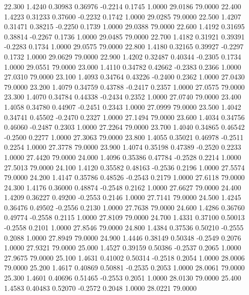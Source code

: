   22.300   1.4240   0.30983   0.36976  -0.2214   0.1745   1.0000  29.0186  79.0000
  22.400   1.4223   0.31233   0.37600  -0.2232   0.1742   1.0000  29.0285  79.0000
  22.500   1.4207   0.31471   0.38215  -0.2250   0.1739   1.0000  29.0388  79.0000
  22.600   1.4192   0.31695   0.38814  -0.2267   0.1736   1.0000  29.0485  79.0000
  22.700   1.4182   0.31921   0.39391  -0.2283   0.1734   1.0000  29.0575  79.0000
  22.800   1.4180   0.32165   0.39927  -0.2297   0.1732   1.0000  29.0629  79.0000
  22.900   1.4202   0.32487   0.40344  -0.2305   0.1734   1.0000  29.0551  79.0000
  23.000   1.4110   0.34782   0.42662  -0.2383   0.2366   1.0000  27.0310  79.0000
  23.100   1.4093   0.34764   0.43226  -0.2400   0.2362   1.0000  27.0430  79.0000
  23.200   1.4079   0.34759   0.43788  -0.2417   0.2357   1.0000  27.0575  79.0000
  23.300   1.4070   0.34784   0.44338  -0.2434   0.2352   1.0000  27.0740  79.0000
  23.400   1.4058   0.34780   0.44907  -0.2451   0.2343   1.0000  27.0999  79.0000
  23.500   1.4042   0.34741   0.45502  -0.2470   0.2327   1.0000  27.1494  79.0000
  23.600   1.4034   0.34756   0.46060  -0.2487   0.2303   1.0000  27.2264  79.0000
  23.700   1.4040   0.34865   0.46542  -0.2500   0.2277   1.0000  27.3063  79.0000
  23.800   1.4055   0.35021   0.46978  -0.2511   0.2254   1.0000  27.3778  79.0000
  23.900   1.4074   0.35198   0.47389  -0.2520   0.2233   1.0000  27.4420  79.0000
  24.000   1.4096   0.35386   0.47784  -0.2528   0.2214   1.0000  27.5013  79.0000
  24.100   1.4120   0.35582   0.48163  -0.2536   0.2196   1.0000  27.5574  79.0000
  24.200   1.4147   0.35786   0.48526  -0.2543   0.2179   1.0000  27.6118  79.0000
  24.300   1.4176   0.36000   0.48874  -0.2548   0.2162   1.0000  27.6627  79.0000
  24.400   1.4209   0.36227   0.49200  -0.2553   0.2146   1.0000  27.7141  79.0000
  24.500   1.4245   0.36476   0.49502  -0.2556   0.2130   1.0000  27.7638  79.0000
  24.600   1.4286   0.36760   0.49774  -0.2558   0.2115   1.0000  27.8109  79.0000
  24.700   1.4331   0.37100   0.50013  -0.2558   0.2101   1.0000  27.8546  79.0000
  24.800   1.4384   0.37536   0.50210  -0.2555   0.2088   1.0000  27.8949  79.0000
  24.900   1.4446   0.38149   0.50348  -0.2549   0.2076   1.0000  27.9321  79.0000
  25.000   1.4527   0.39159   0.50386  -0.2537   0.2065   1.0000  27.9675  79.0000
  25.100   1.4631   0.41002   0.50314  -0.2518   0.2054   1.0000  28.0006  79.0000
  25.200   1.4617   0.40869   0.50881  -0.2535   0.2053   1.0000  28.0061  79.0000
  25.300   1.4601   0.40696   0.51465  -0.2553   0.2051   1.0000  28.0130  79.0000
  25.400   1.4583   0.40483   0.52070  -0.2572   0.2048   1.0000  28.0221  79.0000
